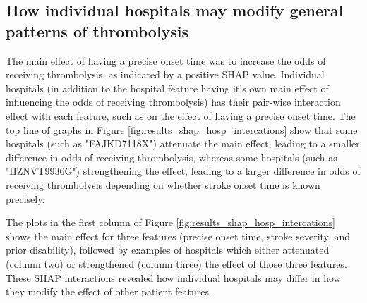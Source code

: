 
\subsection{How individual hospitals may modify general patterns of thrombolysis}

The main effect of having a precise onset time was to increase the odds of receiving thrombolysis, as indicated by a positive SHAP value. Individual hospitals (in addition to the hospital feature having it's own main effect of influencing the odds of receiving thrombolysis) has their pair-wise interaction effect with each feature, such as on the effect of having a precise onset time. The top line of graphs in Figure \ref{fig:results_shap_hosp_intercations} show that some hospitals (such as "FAJKD7118X") attenuate the main effect, leading to a smaller difference in odds of receiving thrombolysis, whereas some hospitals (such as "HZNVT9936G") strengthening the effect, leading to a larger difference in odds of receiving thrombolysis depending on whether stroke onset time is known precisely.


The plots in the first column of Figure \ref{fig:results_shap_hosp_intercations} shows the main effect for three features (precise onset time, stroke severity, and prior disability), followed by examples of hospitals which either attenuated (column two) or strengthened (column three) the effect of those three features. These SHAP interactions revealed how individual hospitals may differ in how they modify the effect of other patient features.

